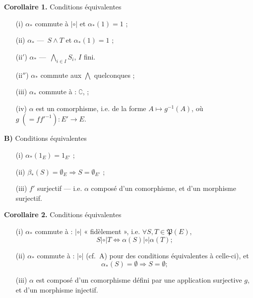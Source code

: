 \documentclass[11pt,a4paper]{article}
\begin{document}
\textbf{Corollaire 1.} Conditions équivalentes
\begin{itemize}
  \item[(i)] $\alpha_*$ commute à $\mathbin{|\circ|}$ et $\alpha_*(1) = 1$ ;
  \item[(ii)] $\alpha_*$ --- \,$S \wedge T$ et $\alpha_*(1) = 1$ ;
  \item[(ii$'$)] $\alpha_*$ --- \,$\bigwedge_{i\in I} S_i$, $I$ fini.
\end{itemize}

\begin{itemize}
  \item[(ii$''$)] $\alpha_*$ commute aux $\bigwedge$ quelconques ;
  \item[(iii)] $\alpha_*$ commute à : $\complement$,  ;
  \item[(iv)] $\alpha$ est un comorphisme, i.e. \struck{$\alpha_*$} \add{$\alpha_*$} de la forme $A \mapsto g^{-1}(A)$, où $g \;(= f f'^{-1})\colon E' \to E$.
\end{itemize}

\textbf{B)} Conditions équivalentes
\begin{itemize}
  \item[(i)] $\alpha_*(1_E) = 1_{E'}$ ;
  \item[(ii)] $\beta_*(S) = \emptyset_E \Longrightarrow S = \emptyset_{E'}$ ;
  \item[(iii)] $f'$ surjectif --- i.e. $\alpha$ composé d'un comorphisme, et d'un morphisme surjectif.
\end{itemize}

\textbf{Corollaire 2.} Conditions équivalentes
\begin{itemize}
  \item[(i)] $\alpha_*$ commute à : $\mathbin{|\circ|}$ « fidèlement », i.e. $\forall S, T \in \mathfrak{P}(E)$,
  \[
    S \mathbin{|\circ|} T \iff \alpha(S) \mathbin{|\circ|} \alpha(T) ;
  \]
  \item[(ii)] $\alpha_*$ commute à : $\mathbin{|\circ|}$ (cf.\ A) pour des conditions équivalentes à celle-ci), et
  \[
    \alpha_*(S) = \emptyset \Longrightarrow S = \emptyset ;
  \]
  \item[(iii)] $\alpha$ est composé d'un comorphisme défini par une application surjective $g$, et d'un morphisme injectif.
\end{itemize}
\end{document}
